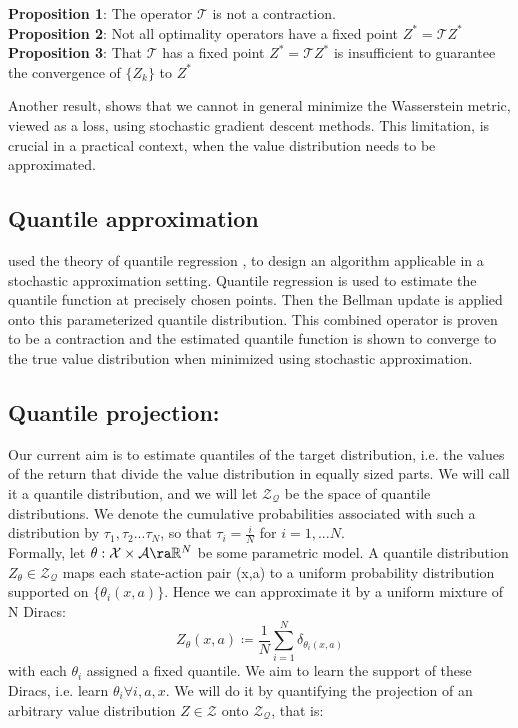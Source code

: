 \textbf{Proposition 1}: The operator $\mathcal{T}$ is not a contraction.\\
\textbf{Proposition 2}: Not all optimality operators have a fixed point $Z^* = \mathcal{T}Z^*$
\textbf{Proposition 3}: That $\mathcal{T}$ has a fixed point $Z^* = \mathcal{T}Z^*$ is insufficient to
guarantee the convergence of $\{Z_k\}$ to $Z^*$

Another result, shows that we cannot in general minimize the Wasserstein metric, 
viewed as a loss, using stochastic gradient descent methods. This limitation, is crucial
in a practical context, when the value distribution needs to be approximated.

\subsection{Quantile approximation}
\cite{Dabney2018a} used the theory of quantile regression \cite{koenker2005}, to
design an algorithm applicable in a stochastic approximation setting.
Quantile regression is used to estimate the quantile function at precisely chosen points.
Then the Bellman update is applied onto this parameterized quantile distribution.
This combined operator is proven to be a contraction and the estimated quantile function
is shown to converge to the true value distribution when minimized using stochastic approximation.

\subsection{Quantile projection:}
Our current aim is to estimate quantiles of the target distribution, i.e. the values 
of the return that divide the value distribution in equally sized parts.
We will call it a quantile distribution,
and we will let $\mathcal{Z_Q}$ be the space of quantile distributions.
We denote the cumulative probabilities associated with such a distribution by $\tau_1,\tau_2...\tau_N$,
so that $\tau_i=\frac{i}{N}$ for $i=1,...N$.\\
Formally, let $\theta : \mathcal{X} \times \mathcal{A} \ra \mathbb R^N $ be some parametric model.
A quantile distribution $Z_\theta \in \mathcal{Z_Q}$ maps each state-action pair (x,a) to a uniform
probability distribution supported on $\{\theta_i(x,a)  \}$. Hence we can approximate it by a 
uniform mixture of N Diracs:
\begin{equation}
    Z_\theta(x,a) \coloneqq \frac{1}{N}\sum_{i=1}^{N}\delta_{\theta_i(x,a)}  \label{eq:discrete_pdf}
\end{equation}
with each $\theta_i$ assigned a fixed quantile.
We aim to learn the support of these Diracs, i.e. learn $\theta_i \forall i, a, x$.
We will do it by quantifying the projection of an arbitrary value distribution $Z \in \mathcal{Z}$
onto $\mathcal{Z_Q}$, that is:

